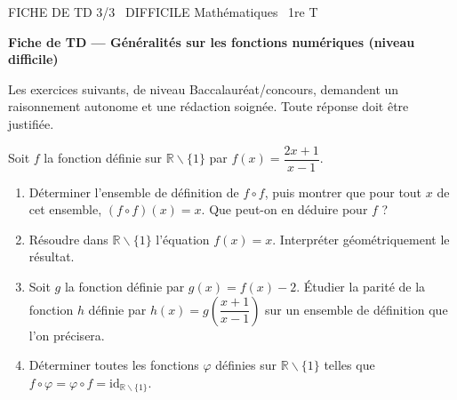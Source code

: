 \documentclass[11pt]{article}
\def\setminus{\mathbin{\backslash}}\let\smallsetminus\setminus
\begin{document}
\begin{tcolorbox}[enhanced,colback=popink,colframe=popink,arc=10pt,boxrule=0pt,left=12pt,right=12pt,top=9pt,bottom=9pt]
{\color{white}\popxbold\small FICHE DE TD 3/3 \textbullet\ DIFFICILE \hfill Mathématiques \textbullet\ 1re T\par}
\end{tcolorbox}
\vspace{4pt}
\textbf{Fiche de TD — Généralités sur les fonctions numériques (niveau difficile)}

Les exercices suivants, de niveau Baccalauréat/concours, demandent un raisonnement autonome et une rédaction soignée. Toute réponse doit être justifiée.

\begin{exercice}
Soit $f$ la fonction définie sur $\mathbb{R}\setminus\{1\}$ par $f(x)=\dfrac{2x+1}{x-1}$.
\begin{enumerate}
\item Déterminer l'ensemble de définition de $f\circ f$, puis montrer que pour tout $x$ de cet ensemble, $(f\circ f)(x)=x$. Que peut-on en déduire pour $f$ ?
\item Résoudre dans $\mathbb{R}\setminus\{1\}$ l'équation $f(x)=x$. Interpréter géométriquement le résultat.
\item Soit $g$ la fonction définie par $g(x)=f(x)-2$. Étudier la parité de la fonction $h$ définie par $h(x)=g\left(\dfrac{x+1}{x-1}\right)$ sur un ensemble de définition que l'on précisera.
\item Déterminer toutes les fonctions $\varphi$ définies sur $\mathbb{R}\setminus\{1\}$ telles que $f\circ\varphi=\varphi\circ f=\mathrm{id}_{\mathbb{R}\setminus\{1\}}$.
\end{enumerate}
\end{exercice}
\end{document}
